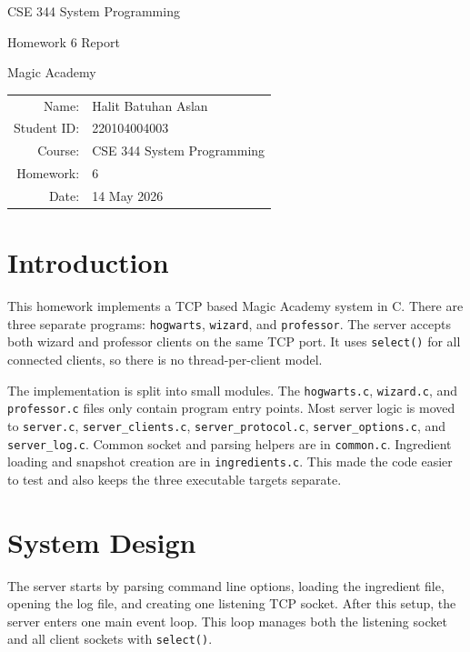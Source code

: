 \documentclass[11pt,a4paper]{article}
\begin{document}
\begin{titlepage}
    \centering
    \vspace*{2cm}
    {\Huge CSE 344 System Programming\par}
    \vspace{0.6cm}
    {\LARGE Homework 6 Report\par}
    \vspace{0.6cm}
    {\Large Magic Academy\par}
    \vfill
    \begin{tabular}{rl}
        Name: & Halit Batuhan Aslan \\
        Student ID: & 220104004003 \\
        Course: & CSE 344 System Programming \\
        Homework: & 6 \\
        Date: & 14 May 2026 \\
    \end{tabular}
    \vfill
\end{titlepage}

\tableofcontents
\newpage

\section{Introduction}

This homework implements a TCP based Magic Academy system in C. There are three separate programs:
\texttt{hogwarts}, \texttt{wizard}, and \texttt{professor}. The server accepts both wizard and professor
clients on the same TCP port. It uses \texttt{select()} for all connected clients, so there is no
thread-per-client model.

The implementation is split into small modules. The \texttt{hogwarts.c}, \texttt{wizard.c}, and
\texttt{professor.c} files only contain program entry points. Most server logic is moved to
\texttt{server.c}, \texttt{server\_clients.c}, \texttt{server\_protocol.c}, \texttt{server\_options.c},
and \texttt{server\_log.c}. Common socket and parsing helpers are in \texttt{common.c}. Ingredient
loading and snapshot creation are in \texttt{ingredients.c}. This made the code easier to test and
also keeps the three executable targets separate.

\section{System Design}

The server starts by parsing command line options, loading the ingredient file, opening the log file,
and creating one listening TCP socket. After this setup, the server enters one main event loop. This
loop manages both the listening socket and all client sockets with \texttt{select()}.
\end{document}
